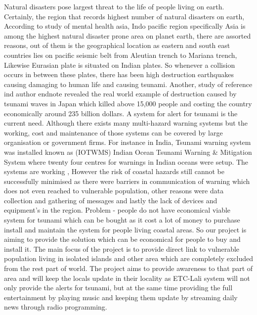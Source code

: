 Natural disasters pose largest threat to the life of people living on earth. Certainly, the region that records highest number of natural disasters on earth, According to study of mental health asia, Indo pacific region specifically Asia is among the highest natural disaster prone area on planet earth, there are assorted reasons, out of them is the geographical location as eastern and south east countries lies   on pacific seismic belt  from Aleutian trench to Mariana trench, Likewise Eurasian plate is situated on Indian plates. So whenever a collision occurs in between these plates, there has been high destruction earthquakes causing damaging to human life and causing tsunami. Another, study of reference ind author endnote revealed the real world example of destruction caused by tsunami waves in Japan which killed above 15,000 people and costing the country economically around 235 billion dollars. A system for alert for tsunami is the current need. Although there exists many multi-hazard warning systems but the working, cost and maintenance of those systems can be covered by large organisation or government firms. For instance in India, Tsunami warning system was installed known as (IOTWMS) Indian Ocean Tsunami Warning & Mitigation System where twenty four centres for warnings in Indian oceans were setup.  The systems are working , However the risk of coastal hazards still cannot be successfully minimised as there were barriers in communication of warning which does not even reached to vulnerable population, other reasons were data collection and gathering of messages and lastly the lack of devices and equipment’s in the region.  Problem  - people do not have economical viable system for tsunami which can be  bought  as it cost a lot of money to  purchase install and maintain the system for people living coastal areas. So our project is aiming to provide the solution which can be economical for people to buy and install it.
The main focus of the project is to provide direct link to vulnerable population living in isolated islands and other area which are completely excluded from the rest part of world. The project aims to provide awareness to that part of area and will keep the locals update in their locality as ETC-Lali system will not only provide the alerts for tsunami, but at the same time providing the full entertainment by playing music and keeping them update by streaming daily news through radio programming.
 


